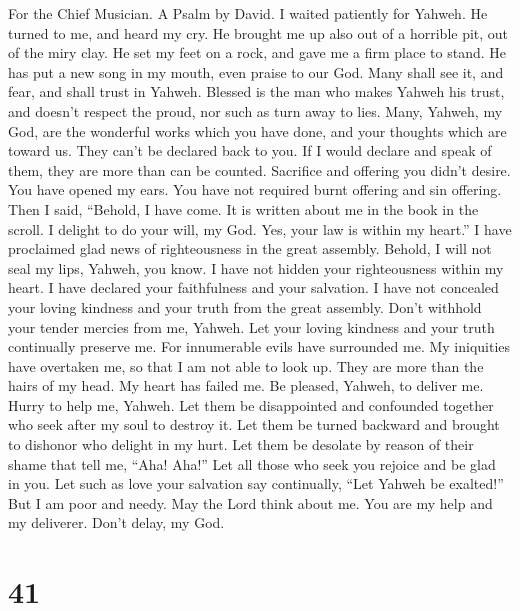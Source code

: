 For the Chief Musician. A Psalm by David.  I waited
patiently for Yahweh. He turned to me, and heard my cry.  He
brought me up also out of a horrible pit, out of the miry clay. He set
my feet on a rock, and gave me a firm place to stand.  He
has put a new song in my mouth, even praise to our God. Many shall see
it, and fear, and shall trust in Yahweh.  Blessed is the man
who makes Yahweh his trust, and doesn't respect the proud, nor such as
turn away to lies.  Many, Yahweh, my God, are the wonderful
works which you have done, and your thoughts which are toward us. They
can't be declared back to you. If I would declare and speak of them,
they are more than can be counted.  Sacrifice and offering
you didn't desire. You have opened my ears. You have not required burnt
offering and sin offering.  Then I said, ``Behold, I have
come. It is written about me in the book in the scroll.  I
delight to do your will, my God. Yes, your law is within my heart.''
 I have proclaimed glad news of righteousness in the great
assembly. Behold, I will not seal my lips, Yahweh, you know.
 I have not hidden your righteousness within my heart. I
have declared your faithfulness and your salvation. I have not concealed
your loving kindness and your truth from the great assembly.
 Don't withhold your tender mercies from me, Yahweh. Let
your loving kindness and your truth continually preserve me.
 For innumerable evils have surrounded me. My iniquities
have overtaken me, so that I am not able to look up. They are more than
the hairs of my head. My heart has failed me.  Be pleased,
Yahweh, to deliver me. Hurry to help me, Yahweh.  Let them
be disappointed and confounded together who seek after my soul to
destroy it. Let them be turned backward and brought to dishonor who
delight in my hurt.  Let them be desolate by reason of
their shame that tell me, ``Aha! Aha!''  Let all those who
seek you rejoice and be glad in you. Let such as love your salvation say
continually, ``Let Yahweh be exalted!''  But I am poor and
needy. May the Lord think about me. You are my help and my deliverer.
Don't delay, my God.

\hypertarget{section-40}{%
\section{41}\label{section-40}}

